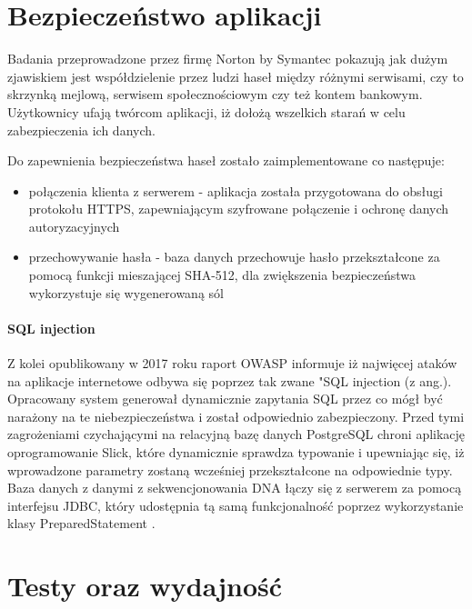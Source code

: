 \documentclass[a4paper,12pt,twoside]{article}
\begin{document}
\newpage
\section{Bezpieczeństwo aplikacji}  
Badania przeprowadzone przez firmę Norton by Symantec \cite{nortonSec}
pokazują jak dużym zjawiskiem jest współdzielenie przez ludzi haseł między różnymi serwisami, czy to
skrzynką mejlową, serwisem społecznościowym czy też kontem bankowym.
Użytkownicy ufają twórcom aplikacji, iż dołożą wszelkich starań w celu zabezpieczenia ich 
danych. 

Do zapewnienia bezpieczeństwa haseł zostało zaimplementowane co następuje:
\begin{itemize}
\item{połączenia klienta z serwerem} - aplikacja została przygotowana do obsługi protokołu HTTPS,
zapewniającym szyfrowane połączenie i ochronę danych autoryzacyjnych
\item{przechowywanie hasła - baza danych przechowuje hasło przekształcone za pomocą funkcji mieszającej SHA-512, dla zwiększenia bezpieczeństwa wykorzystuje się wygenerowaną sól 
}
\end{itemize}

\paragraph{SQL injection} Z kolei opublikowany w 2017 roku raport OWASP \cite{owasp}
informuje iż najwięcej ataków na aplikacje internetowe odbywa się poprzez tak zwane "SQL injection (z ang.). 
Opracowany system generował dynamicznie zapytania SQL przez co mógł być narażony na te niebezpieczeństwa i został odpowiednio zabezpieczony.
Przed tymi zagrożeniami czychającymi na relacyjną bazę danych PostgreSQL chroni aplikację oprogramowanie Slick, które dynamicznie sprawdza typowanie i upewniając się, iż wprowadzone parametry
zostaną wcześniej przekształcone na odpowiednie typy.
Baza danych z danymi z sekwencjonowania DNA łączy się z serwerem za pomocą interfejsu JDBC,
który udostępnia tą samą funkcjonalność poprzez wykorzystanie klasy PreparedStatement \cite{preparedStatement}.


\newpage
\section{Testy oraz wydajność}  
\newpage
\end{document}
